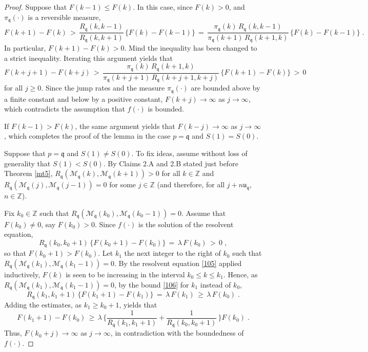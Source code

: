 \documentclass[reqno]{amsart}
\theoremstyle{plain}
\theoremstyle{definition}
\newcommand{\mf}[1]{{\mathfrak #1}}
\newcommand{\bb}[1]{{\mathbb #1}}
\newcommand{\ms}[1]{{\mathscr #1}}
\newcounter{as}[section]
\newcommand{\<}{\langle}
\renewcommand{\>}{\rangle}
\begin{document}
\begin{proof}
Suppose that $F(k-1) \le F(k)$. In this case, since $F(k)>0$, and
$\pi_{\mf q} (\cdot)$ is a reversible measure,
\begin{equation*}
F(k+1) - F(k) \,>\,
\frac{R_{\mf q} (k,k - 1)}{R_{\mf q} (k,k + 1)}
\, \{F(k) - F(k-1)\} \,=\,
\frac{\pi_{\mf q} (k) \, R_{\mf q} (k,k - 1)}
{\pi_{\mf q} (k+1) \, R_{\mf q} (k+1,k)}
\, \{F(k) - F(k-1)\} \;.
\end{equation*}
In particular, $F(k+1) - F(k)>0$. Mind the inequality has been changed
to a strict inequality. Iterating this argument yields that
\begin{equation*}
F(k+j+1) - F(k+j) \,>\,
\frac{\pi_{\mf q} (k) \,  R_{\mf q} (k+1,k)}
{\pi_{\mf q} (k+j+1) \,  R_{\mf q} (k+j+1,k + j)}
\, \{F(k+1) - F(k)\} \,>\, 0 
\end{equation*}
for all $j\ge 0$. Since the jump rates and the measure $\pi_{\mf q}
(\cdot)$ are bounded above by a finite constant and below by a
positive constant, $F(k+j)\to \infty$ as $j\to\infty$, which
contradicts the assumption that $f(\cdot)$ is bounded.

If $F(k-1) > F(k)$, the same argument yields that $F(k-j)\to \infty$
as $j\to\infty$, which completes the proof of the lemma in the case
$p=\mf q$ and $S(1) = S(0)$.  

Suppose that $p=\mf q$ and $S(1) \neq S(0)$. To fix ideas, assume
without loss of generality that $S(1)<S(0)$. By Claims 2.A and 2.B stated
just before Theorem \ref{mt5}, 
$R_{\mf q} (\ms M_{\mf q} (k), \ms M_{\mf q} (k+1)) > 0$ for all
$k\in \bb Z$ and
$R_{\mf q} (\ms M_{\mf q} (j), \ms M_{\mf q} (j-1)) = 0$ for some
$j\in\bb Z$ (and therefore, for all $j+n\mf u_{\mf q}$, $n\in \bb Z$).

Fix $k_0 \in \bb Z$ such that
$R_{\mf q} (\ms M_{\mf q} (k_0), \ms M_{\mf q} (k_0-1)) = 0$. Assume
that $F(k_0) \neq 0$, say $F(k_0) > 0$. Since $f(\cdot)$ is the
solution of the resolvent equation,
\begin{equation}
\label{106}
R_{\mf q} (k_0,k_0 + 1) \, \{F(k_0+1) - F(k_0)\}
\,=\, \lambda\, F(k_0) \,>\, 0\;,
\end{equation}
so that $F(k_0+1) > F(k_0)$.
Let $k_1$ the next integer to the right of $k_0$ such that
$R_{\mf q} (\ms M_{\mf q} (k_1), \ms M_{\mf q} (k_1-1)) = 0$.
By the resolvent equation \eqref{105} applied inductively, $F(k)$ is
seen to be increasing in the interval $k_0\le k\le k_1$. Hence, as
$R_{\mf q} (\ms M_{\mf q} (k_1), \ms M_{\mf q} (k_1-1)) = 0$, by
the bound \eqref{106} for $k_1$ instead of $k_0$, 
\begin{equation*}
R_{\mf q} (k_1,k_1 + 1) \, \{F(k_1+1) - F(k_1)\}
\,=\, \lambda\, F(k_1) \,\ge\, \lambda\, F(k_0)\;.
\end{equation*}
Adding the estimates, as $k_1\ge k_0+1$, yields that
\begin{equation*}
F(k_1+1) - F(k_0) \,\ge\, \lambda\,
\Big\{ \frac{1}{R_{\mf q} (k_1,k_1 + 1)} +
\frac{1}{R_{\mf q} (k_0,k_0 + 1)} \,\Big\} F(k_0)\;.
\end{equation*}
Thus, $F(k_0+j) \to\infty$ as $j\to\infty$, in contradiction with the
boundedness of $f(\cdot)$.


\end{proof}
\end{document}
